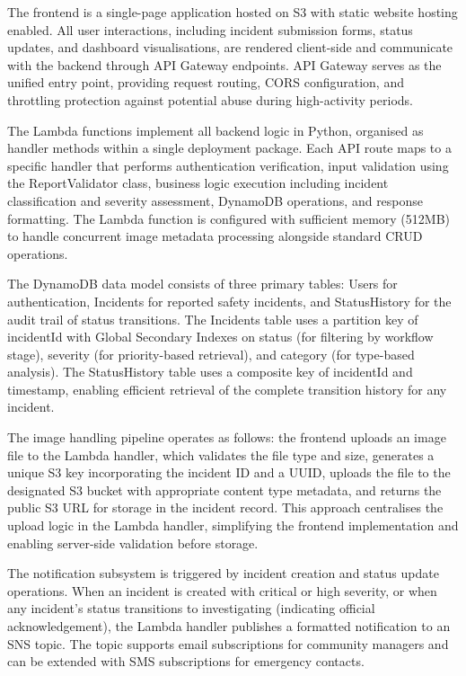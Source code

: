 \documentclass[conference]{IEEEtran}
\begin{document}
The frontend is a single-page application hosted on S3 with static website hosting enabled. All user interactions, including incident submission forms, status updates, and dashboard visualisations, are rendered client-side and communicate with the backend through API Gateway endpoints. API Gateway serves as the unified entry point, providing request routing, CORS configuration, and throttling protection against potential abuse during high-activity periods.

The Lambda functions implement all backend logic in Python, organised as handler methods within a single deployment package. Each API route maps to a specific handler that performs authentication verification, input validation using the ReportValidator class, business logic execution including incident classification and severity assessment, DynamoDB operations, and response formatting. The Lambda function is configured with sufficient memory (512MB) to handle concurrent image metadata processing alongside standard CRUD operations.

The DynamoDB data model consists of three primary tables: Users for authentication, Incidents for reported safety incidents, and StatusHistory for the audit trail of status transitions. The Incidents table uses a partition key of incidentId with Global Secondary Indexes on status (for filtering by workflow stage), severity (for priority-based retrieval), and category (for type-based analysis). The StatusHistory table uses a composite key of incidentId and timestamp, enabling efficient retrieval of the complete transition history for any incident.

The image handling pipeline operates as follows: the frontend uploads an image file to the Lambda handler, which validates the file type and size, generates a unique S3 key incorporating the incident ID and a UUID, uploads the file to the designated S3 bucket with appropriate content type metadata, and returns the public S3 URL for storage in the incident record. This approach centralises the upload logic in the Lambda handler, simplifying the frontend implementation and enabling server-side validation before storage.

The notification subsystem is triggered by incident creation and status update operations. When an incident is created with critical or high severity, or when any incident's status transitions to investigating (indicating official acknowledgement), the Lambda handler publishes a formatted notification to an SNS topic. The topic supports email subscriptions for community managers and can be extended with SMS subscriptions for emergency contacts.
\end{document}
